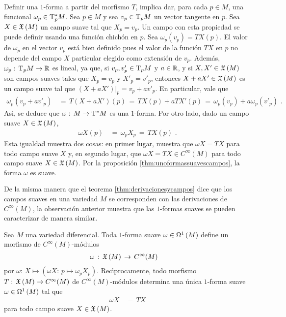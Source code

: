 \begin{obsUnoFormasYCampos}
	Definir una $1$-forma a partir del morfismo $T$, implica dar, para
	cada $p\in M$, una funcional $\omega_{p}\in\tangente*[p]{M}$.
	Sea $p\in M$ y sea $v_{p}\in\tangente[p]{M}$ un vector tangente
	en $p$. Sea $X\in\champs{M}$ un campo suave tal que $X_{p}=v_{p}$.
	Un campo con esta propiedad se puede definir usando una funci\'{o}n
	chich\'{o}n en $p$. Sea $\omega_{p}(v_{p})=TX(p)$. El valor
	de $\omega_{p}$ en el vector $v_{p}$ est\'{a} bien definido pues
	el valor de la funci\'{o}n $TX$ en $p$ no depende del campo $X$
	particular elegido como extensi\'{o}n de $v_{p}$. Adem\'{a}s,
	$\omega_{p}:\,\tangente[p]{M}\rightarrow\bb{R}$ es lineal, ya que,
	si $v_{p},v'_{p}\in\tangente[p]{M}$ y $a\in\bb{R}$, y si
	$X,X'\in\champs{M}$ son campos suaves tales que $X_{p}=v_{p}$ y
	$X'_{p}=v'_{p}$, entonces $X+aX'\in\champs{M}$ es un campo suave
	tal que $(X+aX')|_{p}=v_{p}+av'_{p}$. En particular, vale que
	\begin{align*}
		\omega_{p}(v_{p}+av'_{p}) & \,=\,T(X+aX')(p) \,=\,
			TX(p)+aTX'(p) \,=\,
			\omega_{p}(v_{p})+a\omega_{p}(v'_{p})
		\text{ .}
	\end{align*}
	As\'{\i}, se deduce que $\omega:\,M\rightarrow\tangente*{M}$ es una
	$1$-forma. Por otro lado, dado un campo suave $X\in\champs{M}$,
	\begin{align*}
		\omega X (p) & \,=\,\omega_{p}X_{p} \,=\, TX(p)
		\text{ .}
	\end{align*}
	Esta igualdad muestra dos cosas: en primer lugar, muestra que
	$\omega X=TX$ para todo campo suave $X$ y, en segundo lugar, que
	$\omega X=TX\in C^{\infty}(M)$ para todo campo suave
	$X\in\champs{M}$. Por la proposici\'{o}n
	\ref{thm:unoformassuavescampos}, la forma $\omega$ es suave.
\end{obsUnoFormasYCampos}

De la misma manera que el teorema \ref{thm:derivacionesycampos} dice que
los campos suaves en una variedad $M$ se corresponden con las derivaciones de
$C^{\infty}(M)$, la observaci\'{o}n anterior muestra que las $1$-formas
suaves se pueden caracterizar de manera similar.

\begin{teoUnoFormasSuavesComoMorfismos}%
	\label{thm:unoformassuavescomomorfismos}
	Sea $M$ una variedad diferencial. Toda $1$-forma suave
	$\omega\in\formes[1]{M}$ define un morfismo de
	$C^{\infty}(M)$-m\'{o}dulos
	\begin{align*}
		\omega & \,:\,\champs{M}\,\rightarrow\,C^{\infty}(M)
	\end{align*}
	por $\omega:\,X\mapsto (\omega X:\,p\mapsto\omega_{p}X_{p})$.
	Rec\'{\i}procamente, todo morfismo $T:\,%
	\champs{M}\rightarrow C^{\infty}(M)$ de $C^{\infty}(M)$-m\'{o}dulos
	determina una \'{u}nica $1$-forma suave $\omega\in\formes[1]{M}$
	tal que
	\begin{align*}
		\omega X & \,=\, TX
	\end{align*}
	para todo campo suave $X\in\champs{M}$.
\end{teoUnoFormasSuavesComoMorfismos}

